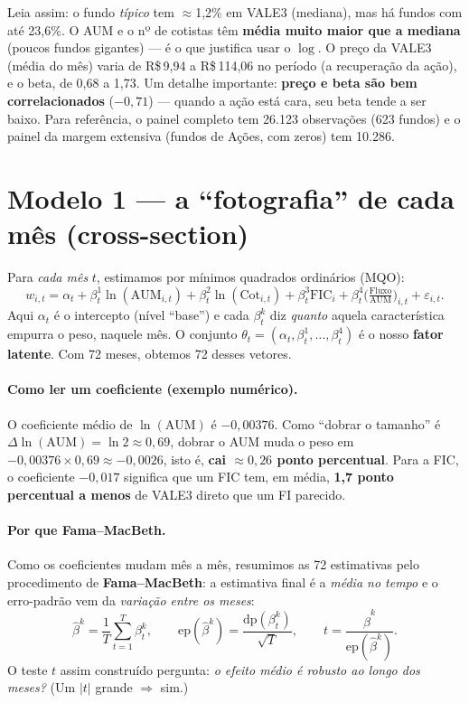 \documentclass[11pt]{article}
\begin{document}
\noindent Leia assim: o fundo \emph{típico} tem $\approx$1,2\% em VALE3 (mediana), mas
há fundos com até 23,6\%. O AUM e o nº de cotistas têm \textbf{média muito maior que a
mediana} (poucos fundos gigantes) --- é o que justifica usar o $\log$. O preço da VALE3
(média do mês) varia de R\$\,9,94 a R\$\,114,06 no período (a recuperação da ação), e o
beta, de 0,68 a 1,73. Um detalhe importante: \textbf{preço e beta são bem correlacionados}
($-0{,}71$) --- quando a ação está cara, seu beta tende a ser baixo. Para referência, o painel
completo tem 26.123 observações (623 fundos) e o painel da margem extensiva (fundos de
Ações, com zeros) tem 10.286.

\section{Modelo 1 --- a ``fotografia'' de cada mês (cross-section)}

Para \emph{cada mês} $t$, estimamos por mínimos quadrados ordinários (MQO):
\begin{equation}
w_{i,t} = \alpha_t
+ \beta^{1}_t \ln(\text{AUM}_{i,t})
+ \beta^{2}_t \ln(\text{Cot}_{i,t})
+ \beta^{3}_t \text{FIC}_i
+ \beta^{4}_t \Big(\tfrac{\text{Fluxo}}{\text{AUM}}\Big)_{i,t}
+ \varepsilon_{i,t}.
\label{eq:cs}
\end{equation}
Aqui $\alpha_t$ é o intercepto (nível ``base'') e cada $\beta^k_t$ diz \emph{quanto}
aquela característica empurra o peso, naquele mês. O conjunto
$\theta_t=(\alpha_t,\beta^1_t,\dots,\beta^4_t)$ é o nosso \textbf{fator latente}. Com
72 meses, obtemos 72 desses vetores.

\paragraph{Como ler um coeficiente (exemplo numérico).} O coeficiente médio de
$\ln(\text{AUM})$ é $-0{,}00376$. Como ``dobrar o tamanho'' é $\Delta\ln(\text{AUM})
=\ln 2 \approx 0{,}69$, dobrar o AUM muda o peso em $-0{,}00376\times 0{,}69 \approx
-0{,}0026$, isto é, \textbf{cai $\approx 0{,}26$ ponto percentual}. Para a FIC, o
coeficiente $-0{,}017$ significa que um FIC tem, em média, \textbf{1,7 ponto
percentual a menos} de VALE3 direto que um FI parecido.

\paragraph{Por que Fama--MacBeth.} Como os coeficientes mudam mês a mês, resumimos as
72 estimativas pelo procedimento de \textbf{Fama--MacBeth}: a estimativa final é a
\emph{média no tempo} e o erro-padrão vem da \emph{variação entre os meses}:
\begin{equation}
\widehat{\beta}^k = \frac{1}{T}\sum_{t=1}^{T}\beta^k_t,\qquad
\mathrm{ep}(\widehat{\beta}^k)=\frac{\mathrm{dp}(\beta^k_t)}{\sqrt{T}},\qquad
t=\frac{\widehat{\beta}^k}{\mathrm{ep}(\widehat{\beta}^k)}.
\label{eq:fm}
\end{equation}
O teste $t$ assim construído pergunta: \emph{o efeito médio é robusto ao longo dos
meses?} (Um $|t|$ grande $\Rightarrow$ sim.)
\end{document}
